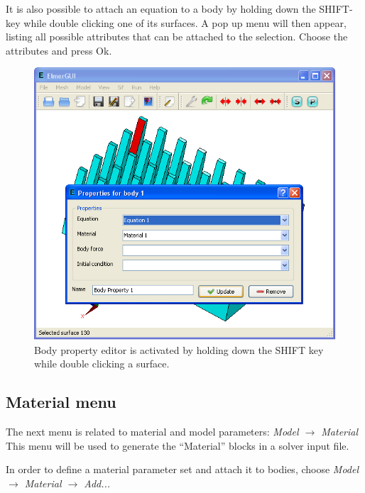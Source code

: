 \documentclass[a4paper,12pt]{article}
\newcommand{\menu}[2]{{\it \vskip2mm #1 $\rightarrow$ #2 \vskip2mm}}
\newcommand{\dynmenu}[3]{{\it \vskip2mm #1 $\rightarrow$ #2 $\rightarrow$ #3 \vskip2mm}}
\begin{document}
It is also possible to attach an equation to a body by holding down the SHIFT-key
while double clicking one of its surfaces. A pop up menu will then appear,
listing all possible attributes that can be attached to the selection. Choose the
attributes and press Ok.

\begin{figure}[ht]
\begin{center}
 \includegraphics[scale=0.5]{images/bodyproperties.png}
\caption{Body property editor is activated by holding down the SHIFT key while double
clicking a surface.}
\end{center}
\end{figure}

\subsection{Material menu}

The next menu is related to material and model parameters:
\menu{Model}{Material}
\noindent This menu will be used to generate the ``Material'' blocks in a solver
input file.

In order to define a material parameter set and attach it to bodies, choose
\dynmenu{Model}{Material}{Add...}
\noindent 
\end{document}
